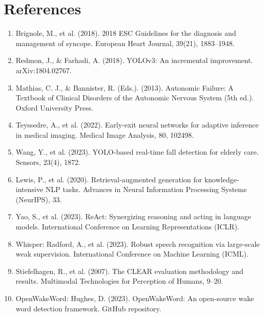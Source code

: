 \documentclass[11pt,a4paper]{article}
\begin{document}
\section*{References}
\begin{enumerate}[leftmargin=1.4em]
  \item Brignole, M., et al. (2018). 2018 ESC Guidelines for the diagnosis and management of syncope. European Heart Journal, 39(21), 1883--1948.
  \item Redmon, J., \& Farhadi, A. (2018). YOLOv3: An incremental improvement. arXiv:1804.02767.
  \item Mathias, C. J., \& Bannister, R. (Eds.). (2013). Autonomic Failure: A Textbook of Clinical Disorders of the Autonomic Nervous System (5th ed.). Oxford University Press.
  \item Teyssedre, A., et al. (2022). Early-exit neural networks for adaptive inference in medical imaging. Medical Image Analysis, 80, 102498.
  \item Wang, Y., et al. (2023). YOLO-based real-time fall detection for elderly care. Sensors, 23(4), 1872.
  \item Lewis, P., et al. (2020). Retrieval-augmented generation for knowledge-intensive NLP tasks. Advances in Neural Information Processing Systems (NeurIPS), 33.
  \item Yao, S., et al. (2023). ReAct: Synergizing reasoning and acting in language models. International Conference on Learning Representations (ICLR).
  \item Whisper: Radford, A., et al. (2023). Robust speech recognition via large-scale weak supervision. International Conference on Machine Learning (ICML).
  \item Stiefelhagen, R., et al. (2007). The CLEAR evaluation methodology and results. Multimodal Technologies for Perception of Humans, 9--20.
  \item OpenWakeWord: Hughes, D. (2023). OpenWakeWord: An open-source wake word detection framework. GitHub repository.
\end{enumerate}

\printglossary[type=\acronymtype,title=Acronyms]
\printglossary[title=Terminology]
\end{document}
